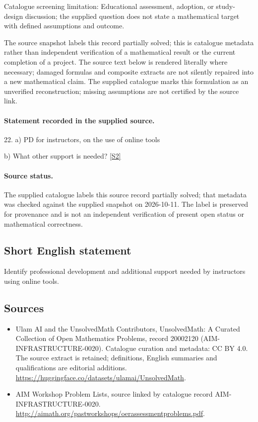\documentclass[11pt]{article}
\begin{document}
Catalogue screening limitation: Educational assessment, adoption, or study-design discussion; the supplied question does not state a mathematical target with defined assumptions and outcome.

The source snapshot labels this record partially solved; this is catalogue metadata rather than independent verification of a mathematical result or the current completion of a project.
The source text below is rendered literally where necessary; damaged formulas and composite extracts are not silently repaired into a new mathematical claim.
The supplied catalogue marks this formulation as an unverified reconstruction; missing assumptions are not certified by the source link.
\paragraph{Statement recorded in the supplied source.}
22. a) PD for instructors, on the use of online tools

b) What other support is needed? \href{http://aimath.org/pastworkshops/oerassessmentproblems.pdf}{[S2]}
\paragraph{Source status.}
The supplied catalogue labels this source record partially solved; that metadata was checked against the supplied snapshot on 2026-10-11. The label is preserved for provenance and is not an independent verification of present open status or mathematical correctness.
\subsection{Short English statement}
Identify professional development and additional support needed by instructors using online tools.
\subsection{Sources}
\begin{itemize}
\item[S1] Ulam AI and the UnsolvedMath Contributors, UnsolvedMath: A Curated Collection of Open Mathematics Problems, record 20002120 (AIM-INFRASTRUCTURE-0020). Catalogue curation and metadata: CC BY 4.0. The source extract is retained; definitions, English summaries and qualifications are editorial additions.
\url{https://huggingface.co/datasets/ulamai/UnsolvedMath}.
\item[S2] AIM Workshop Problem Lists, source linked by catalogue record AIM-INFRASTRUCTURE-0020.
\url{http://aimath.org/pastworkshops/oerassessmentproblems.pdf}.
\end{itemize}
\end{document}
